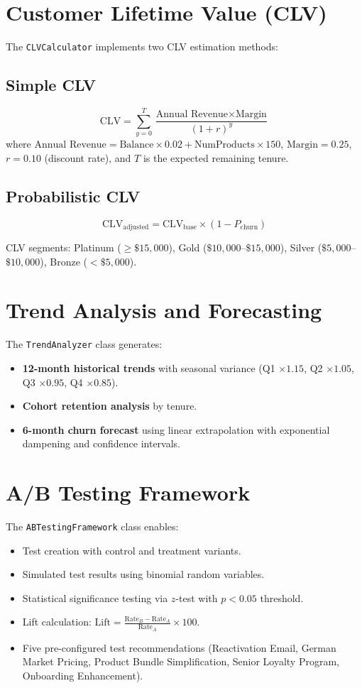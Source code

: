 \documentclass[12pt, a4paper]{report}
\begin{document}
\section{Customer Lifetime Value (CLV)}

The \texttt{CLVCalculator} implements two CLV estimation methods:

\subsection{Simple CLV}
\[
\text{CLV} = \sum_{y=0}^{T} \frac{\text{Annual Revenue} \times \text{Margin}}{(1 + r)^y}
\]
where $\text{Annual Revenue} = \text{Balance} \times 0.02 + \text{NumProducts} \times 150$, $\text{Margin} = 0.25$, $r = 0.10$ (discount rate), and $T$ is the expected remaining tenure.

\subsection{Probabilistic CLV}
\[
\text{CLV}_{\text{adjusted}} = \text{CLV}_{\text{base}} \times (1 - P_{\text{churn}})
\]

CLV segments: Platinum ($\geq \$15{,}000$), Gold ($\$10{,}000$--$\$15{,}000$), Silver ($\$5{,}000$--$\$10{,}000$), Bronze ($< \$5{,}000$).

\section{Trend Analysis and Forecasting}

The \texttt{TrendAnalyzer} class generates:
\begin{itemize}
    \item \textbf{12-month historical trends} with seasonal variance (Q1 $\times 1.15$, Q2 $\times 1.05$, Q3 $\times 0.95$, Q4 $\times 0.85$).
    \item \textbf{Cohort retention analysis} by tenure.
    \item \textbf{6-month churn forecast} using linear extrapolation with exponential dampening and confidence intervals.
\end{itemize}

\section{A/B Testing Framework}

The \texttt{ABTestingFramework} class enables:
\begin{itemize}
    \item Test creation with control and treatment variants.
    \item Simulated test results using binomial random variables.
    \item Statistical significance testing via $z$-test with $p < 0.05$ threshold.
    \item Lift calculation: $\text{Lift} = \frac{\text{Rate}_B - \text{Rate}_A}{\text{Rate}_A} \times 100$.
    \item Five pre-configured test recommendations (Reactivation Email, German Market Pricing, Product Bundle Simplification, Senior Loyalty Program, Onboarding Enhancement).
\end{itemize}
\end{document}
